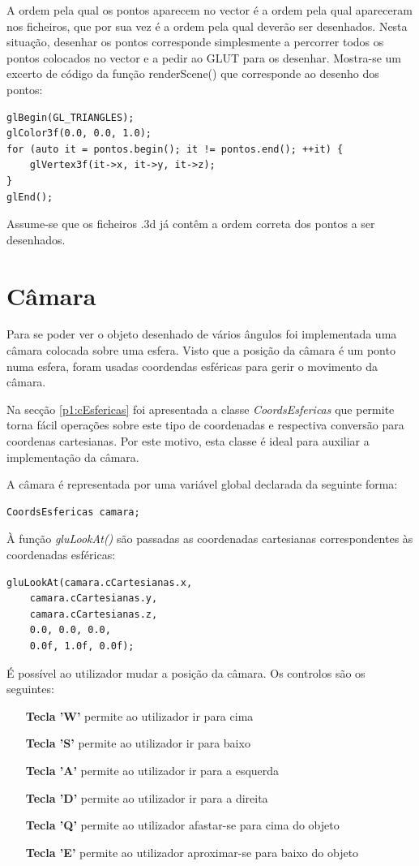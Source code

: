 A ordem pela qual os pontos aparecem no vector é a ordem pela qual apareceram nos ficheiros, que por sua vez é a ordem pela qual deverão ser desenhados. Nesta situação, desenhar os pontos corresponde simplesmente a percorrer todos os pontos colocados no vector e a pedir ao GLUT para os desenhar. Mostra-se um excerto de código da função renderScene() que corresponde ao desenho dos pontos:

\begin{Verbatim}
glBegin(GL_TRIANGLES);
glColor3f(0.0, 0.0, 1.0);
for (auto it = pontos.begin(); it != pontos.end(); ++it) {
	glVertex3f(it->x, it->y, it->z);
}
glEnd();
\end{Verbatim}

Assume-se que os ficheiros .3d já contêm a ordem correta dos pontos a ser desenhados.

\section{Câmara}

Para se poder ver o objeto desenhado de vários ângulos foi implementada uma câmara colocada sobre uma esfera. Visto que a posição da câmara é um ponto numa esfera, foram usadas coordendas esféricas para gerir o movimento da câmara.

Na secção \ref{p1:cEsfericas} foi apresentada a classe \textit{CoordsEsfericas} que permite torna fácil operações sobre este tipo de coordenadas e respectiva conversão para coordenas cartesianas. Por este motivo, esta classe é ideal para auxiliar a implementação da câmara.

A câmara é representada por uma variável global declarada da seguinte forma:

\begin{Verbatim}
CoordsEsfericas camara;
\end{Verbatim}

À função \textit{gluLookAt()} são passadas as coordenadas cartesianas correspondentes às coordenadas esféricas:

\begin{Verbatim}
gluLookAt(camara.cCartesianas.x,
	camara.cCartesianas.y,
	camara.cCartesianas.z,
	0.0, 0.0, 0.0,
	0.0f, 1.0f, 0.0f);
\end{Verbatim}

É possível ao utilizador mudar a posição da câmara. Os controlos são os seguintes:

\begin{itemize}
	\item[\textbf{Tecla 'W'}] permite ao utilizador ir para cima
	\item[\textbf{Tecla 'S'}] permite ao utilizador ir para baixo
	\item[\textbf{Tecla 'A'}] permite ao utilizador ir para a esquerda
	\item[\textbf{Tecla 'D'}] permite ao utilizador ir para a direita
	\item[\textbf{Tecla 'Q'}] permite ao utilizador afastar-se  para cima do objeto
	\item[\textbf{Tecla 'E'}] permite ao utilizador aproximar-se para baixo do objeto
\end{itemize}

